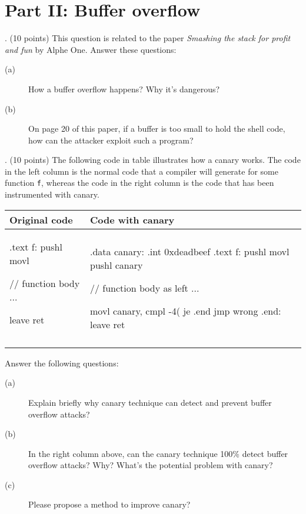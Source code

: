\documentclass[a4paper, 10pt]{article}
\newcommand{\mynoindent}{\noindent}
\begin{document}
\newpage
\section*{Part II: Buffer overflow}
\mynoindent 3. (10 points) This question is related to the paper
\textit{Smashing the stack for profit and fun} by Alphe One. Answer
these questions:
\begin{description}
  \item[(a)] How a buffer overflow happens? Why it's dangerous?
  \item[(b)] On page 20 of this paper, if a buffer is too
  small to hold the shell code, how can the attacker exploit such a program?
\end{description}


\newpage
{}. (10 points) The following code in table
illustrates how a canary works. The code in the left column
is the normal code that a compiler will generate for some
function \texttt{f}, whereas the code in the right column is the code
that has been instrumented with canary.\\
\begin{center}
\begin{tabular}{|l|l|}
\hline
Original code & Code with canary\\
\hline
\begin{minipage}[b]{6cm}
\begin{code}
    .text
f:
    pushl    %
    movl     %

    // function body
    ...

    leave
    ret
\end{code}
\vskip3cm
$ $
\end{minipage}&
\begin{minipage}[b]{6cm}
\begin{code}
    .data
canary:
    .int     0xdeadbeef
    .text
f:
    pushl    %
    movl     %
    pushl    canary

    // function body as left
    ...

    movl     canary, %
    cmpl     -4(%
    je       .end
    jmp      wrong
    .end:
    leave
    ret
\end{code}
\end{minipage}\\
\hline
\end{tabular}
\end{center}
Answer the following questions:
\begin{description}
  \item[(a)] Explain briefly why canary technique can
  detect and prevent buffer overflow attacks?
  \item[(b)] In the right column above, can the canary
  technique 100\% detect buffer overflow attacks? Why?
  What's the potential problem with canary?
  \item[(c)] Please propose a method to improve canary?
\end{description}
\end{document}
